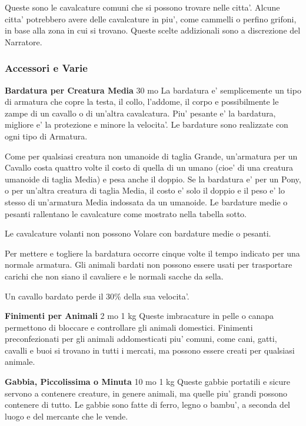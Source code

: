 \documentclass[a4paper,11pt,twoside,openany]{book}
\begin{document}
{Queste sono le cavalcature comuni che si possono trovare nelle citta'. Alcune citta' potrebbero avere delle cavalcature in piu', come cammelli o perfino grifoni, in base alla zona in cui si trovano. Queste scelte addizionali sono a discrezione del Narratore.

\subsubsection{Accessori e Varie}

\label{accessori-e-varie}

\textbf{Bardatura per Creatura Media} 30 mo La bardatura e' semplicemente un tipo di armatura che copre la testa, il collo, l'addome, il corpo e possibilmente le zampe di un cavallo o di un'altra cavalcatura. Piu' pesante e' la bardatura, migliore e' la protezione e minore la velocita'. Le bardature sono realizzate con ogni tipo di Armatura.

Come per qualsiasi creatura non umanoide di taglia Grande, un'armatura per un Cavallo costa quattro volte il costo di quella di un umano (cioe' di una creatura umanoide di taglia Media) e pesa anche il doppio. Se la bardatura e' per un Pony, o per un'altra creatura di taglia Media, il costo e' solo il doppio e il peso e' lo stesso di un'armatura Media indossata da un umanoide. Le bardature medie o pesanti rallentano le cavalcature come mostrato nella tabella sotto.

Le cavalcature volanti non possono Volare con bardature medie o pesanti.

Per mettere e togliere la bardatura occorre cinque volte il tempo indicato per una normale armatura. Gli animali bardati non possono essere usati per trasportare carichi che non siano il cavaliere e le normali sacche da sella.

Un cavallo bardato perde il 30\% della sua velocita'.

\textbf{Finimenti per Animali} 2 mo 1 kg Queste imbracature in pelle o canapa permettono di bloccare e controllare gli animali domestici. Finimenti preconfezionati per gli animali addomesticati piu' comuni, come cani, gatti, cavalli e buoi si trovano in tutti i mercati, ma possono essere creati per qualsiasi animale.

\textbf{Gabbia, Piccolissima o Minuta} 10 mo 1 kg Queste gabbie portatili e sicure servono a contenere creature, in genere animali, ma quelle piu' grandi possono contenere di tutto. Le gabbie sono fatte di ferro, legno o bambu', a seconda del luogo e del mercante che le vende. 

}
\end{document}
